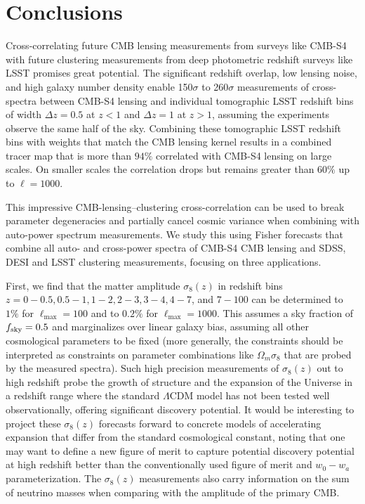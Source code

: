 \documentclass[prd,superscriptaddress,floatfix,notitlepage,nofootinbib,reprint]{revtex4-1} %
\begin{document}
\section{Conclusions}
\label{se:conclusions}

Cross-correlating future CMB lensing measurements from surveys like CMB-S4 with future clustering measurements from deep photometric redshift surveys like LSST promises great potential. 
The significant redshift overlap, low lensing noise, and high galaxy number density enable 150$\sigma$ to 260$\sigma$ measurements of  cross-spectra between CMB-S4 lensing and individual tomographic LSST redshift bins of width $\Delta z=0.5$ at $z<1$ and $\Delta z=1$ at $z>1$, assuming the experiments observe the same half of the sky.
Combining these tomographic LSST redshift bins with weights that match the CMB lensing kernel results in a combined tracer map that is more than $94\%$ correlated with CMB-S4 lensing on large scales. 
On smaller scales the correlation drops but remains greater than $60\%$ up to $\ell=1000$.


This impressive CMB-lensing--clustering cross-correlation can be used to break parameter degeneracies and partially cancel cosmic variance when combining with auto-power spectrum measurements.
We study this using Fisher forecasts that combine all auto- and cross-power spectra of CMB-S4 CMB lensing and SDSS, DESI and LSST clustering measurements, focusing on three applications.



First, we find that the matter amplitude $\sigma_8(z)$ in redshift bins $z=0-0.5,0.5-1,1-2,2-3,3-4,4-7$, and $7-100$ can be determined to $1\%$ for $\ell_\mathrm{max}=100$ and to $0.2\%$ for $\ell_\mathrm{max}=1000$. 
This assumes a sky fraction of ${f_\mathrm{sky}}=0.5$ and marginalizes over linear galaxy bias, assuming all other cosmological parameters to be fixed (more generally, the constraints should be interpreted as constraints on parameter combinations like $\Omega_m\sigma_8$ that are probed by the measured spectra).
Such high precision measurements of $\sigma_8(z)$ out to high redshift probe the growth of structure and the expansion of the Universe in a redshift range where the standard $\Lambda$CDM model has not been tested well observationally, offering significant discovery potential.
It would be interesting to project these $\sigma_8(z)$ forecasts forward to concrete models of accelerating expansion that differ from the standard cosmological constant, noting that one may want to define a new figure of merit to capture potential discovery potential at high redshift better than the conventionally used figure of merit and $w_0-w_a$ parameterization.
The $\sigma_8(z)$ measurements also carry information on the sum of neutrino masses when comparing with the amplitude of the primary CMB.
\end{document}
